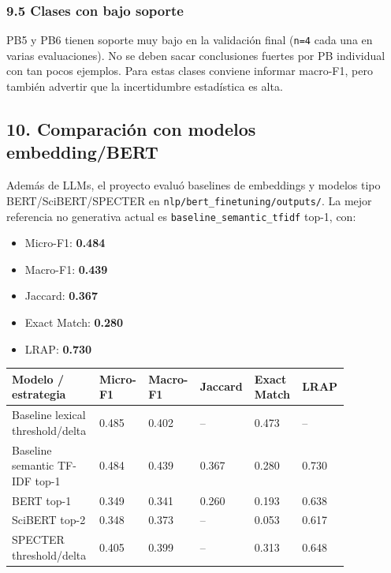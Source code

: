 \subsubsection{9.5 Clases con bajo soporte}

PB5 y PB6 tienen soporte muy bajo en la validación final (\texttt{n=4} cada una en varias evaluaciones). No se deben sacar conclusiones fuertes por PB individual con tan pocos ejemplos. Para estas clases conviene informar macro-F1, pero también advertir que la incertidumbre estadística es alta.

\subsection{10. Comparación con modelos embedding/BERT}

Además de LLMs, el proyecto evaluó baselines de embeddings y modelos tipo BERT/SciBERT/SPECTER en \texttt{nlp/bert\_finetuning/outputs/}. La mejor referencia no generativa actual es \texttt{baseline\_semantic\_tfidf} top-1, con:

\begin{itemize}
\item Micro-F1: \textbf{0.484}
\item Macro-F1: \textbf{0.439}
\item Jaccard: \textbf{0.367}
\item Exact Match: \textbf{0.280}
\item LRAP: \textbf{0.730}
\end{itemize}

\begin{center}
\scriptsize
\setlength{\tabcolsep}{4pt}
\renewcommand{\arraystretch}{1.15}
\begin{tabular}{p{0.25\linewidth}p{0.12\linewidth}p{0.12\linewidth}p{0.12\linewidth}p{0.12\linewidth}p{0.12\linewidth}}
\toprule
Modelo / estrategia & Micro-F1 & Macro-F1 & Jaccard & Exact Match & LRAP \\
\midrule
Baseline lexical threshold/delta & 0.485 & 0.402 & -- & 0.473 & -- \\
Baseline semantic TF-IDF top-1 & 0.484 & 0.439 & 0.367 & 0.280 & 0.730 \\
BERT top-1 & 0.349 & 0.341 & 0.260 & 0.193 & 0.638 \\
SciBERT top-2 & 0.348 & 0.373 & -- & 0.053 & 0.617 \\
SPECTER threshold/delta & 0.405 & 0.399 & -- & 0.313 & 0.648 \\
\bottomrule
\end{tabular}
\end{center}

